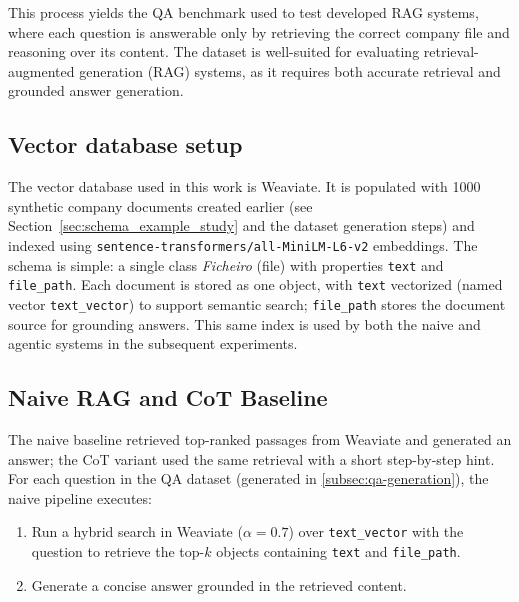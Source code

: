 This process yields the QA benchmark used to test developed RAG systems, where each question is answerable only by retrieving the correct company file and reasoning over its content. The dataset is well-suited for evaluating retrieval-augmented generation (RAG) systems, as it requires both accurate retrieval and grounded answer generation.

\subsection{Vector database setup}
The vector database used in this work is Weaviate. It is populated with 1000 synthetic company documents created earlier (see Section~\ref{sec:schema_example_study} and the dataset generation steps) and indexed using \texttt{sentence-transformers/all-MiniLM-L6-v2} embeddings. The schema is simple: a single class \textit{Ficheiro} (file) with properties \texttt{text} and \texttt{file\_path}. Each document is stored as one object, with \texttt{text} vectorized (named vector \texttt{text\_vector}) to support semantic search; \texttt{file\_path} stores the document source for grounding answers. This same index is used by both the naive and agentic systems in the subsequent experiments.

\subsection{Naive RAG and CoT Baseline}
\label{sec:naive-rag-and-cot-baseline}
The naive baseline retrieved top-ranked passages from Weaviate and generated an answer; the CoT variant used the same retrieval with a short step-by-step hint.
For each question in the QA dataset (generated in \ref{subsec:qa-generation}), the naive pipeline executes:
\begin{enumerate}
    \item Run a hybrid search in Weaviate (\(\alpha = 0.7\)) over \texttt{text\_vector} with the question to retrieve the top-$k$ objects containing \texttt{text} and \texttt{file\_path}.
    \item Generate a concise answer grounded in the retrieved content.
\end{enumerate}

